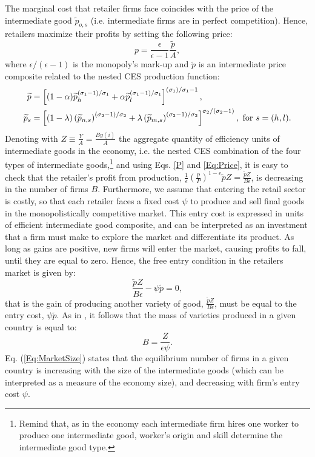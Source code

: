 \documentclass[a4paper,12pt]{article}
\begin{document}
The marginal cost that retailer firms face coincides with the price of the
intermediate good $\widetilde{p}_{o,s}$ (i.e. intermediate firms are in perfect
competition). Hence, retailers maximize their profits by setting the
following price: 
\begin{equation}
p=\frac{\epsilon }{\epsilon -1}\frac{\widetilde{p}}{A},  \label{Eq:Price}
\end{equation}%
where $\epsilon /(\epsilon -1)$ is the monopoly's mark-up and $\widetilde{p}$
is an intermediate price composite related to the nested CES production
function: 
\begin{align}
\widetilde{p}& =\left[ (1-\alpha )\widetilde{p}_{h}^{(\sigma _{1}-1)/\sigma
_{1}}+\alpha \widetilde{p}_{l}^{(\sigma _{1}-1)/\sigma _{1}}\right]
^{(\sigma _{1})/\sigma _{1}-1}, \\
\widetilde{p}_{s}& =\left[ (1-\lambda )\left(\widetilde{p}_{n,s}\right)
^{(\sigma _{2}-1)/\sigma _{2}}+\lambda \left(\widetilde{p}_{m,s}\right)
^{(\sigma _{2}-1)/\sigma _{2}}\right] ^{\sigma _{2}/(\sigma _{2}-1)},\text{
for $s=(h,l)$}.  \notag \end{align}
Denoting with $Z \equiv \frac{Y}{A}=\frac{B y(i)}{A}$ the aggregate quantity of efficiency units of intermediate goods in the economy, i.e. the nested CES combination of the four types of intermediate goods,\footnote{Remind that, as in the economy each intermediate firm hires one worker to produce one intermediate good, worker's origin and skill determine the intermediate good type.} and using Eqs. \eqref{P} and \eqref{Eq:Price}, it is easy to check that the retailer's profit from production, $\frac{1}{\epsilon} \left( \frac{p}{P} \right)^{1-\epsilon} \widetilde{p} Z= \frac{\widetilde{p} Z}{B \epsilon}$, is decreasing in the number of firms $B$. Furthermore, we assume that entering the retail sector is costly, so that each retailer faces a
fixed cost $\psi $ to produce and sell final goods in the monopolistically competitive market. This entry cost is expressed in
units of efficient intermediate good composite, and can be interpreted as an
investment that a firm must make to explore the market and differentiate its
product. As long as gains are positive, new firms will enter the market,
causing profits to fall, until they are equal to zero. Hence, the free entry
condition in the retailers market is given by: 
\begin{equation*}
\frac{\widetilde{p}Z}{B\epsilon }-\psi \widetilde{p}=0,
\end{equation*}%
that is the gain of producing another variety of good, $\frac{\widetilde{p}Z
}{B\epsilon }$, must be equal to the entry cost, $\psi \widetilde{p}$. As in
\cite{Krugman1980}, it follows that the mass of varieties produced in a given
country is equal to: 
\begin{equation}
B=\frac{Z}{\epsilon \psi }.  \label{Eq:MarketSize}
\end{equation}%
Eq. (\ref{Eq:MarketSize}) states that the equilibrium number of firms in a
given country is increasing with the size of the intermediate goods (which
can be interpreted as a measure of the economy size), and decreasing with
firm's entry cost $\psi $.
\end{document}
